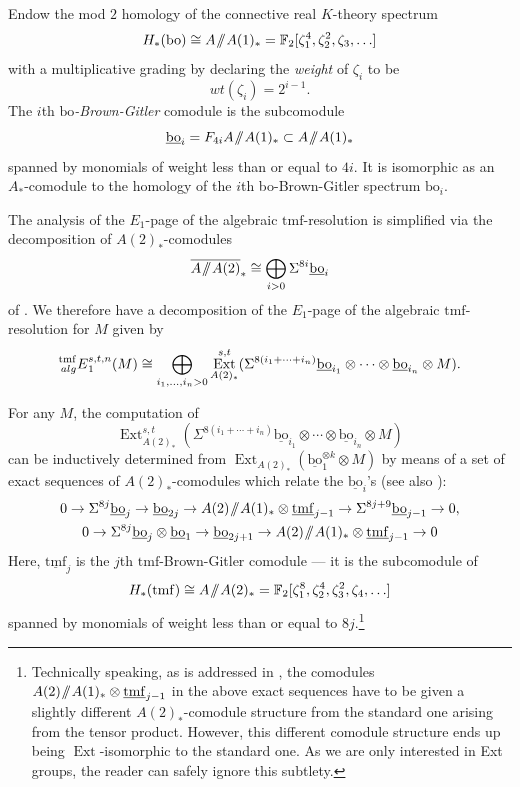 \documentclass[10pt]{amsart}
\newcommand{\sslash}{\mathbin{/\mkern-6mu/}}
\newcommand{\mmod}{\! \sslash \!}
\newcommand{\ul}[1]{\underline{#1}}
\newcommand{\br}[1]{\overline{#1}}
\newcommand{\FF}{\mathbb{F}}
\newcommand{\tmf}{\mathrm{tmf}}
\newcommand{\bo}{\mathrm{bo}}
\newcommand{\bou}{\ul{\bo}}
\theoremstyle{definition}
\numberwithin{equation}{section}
\numberwithin{figure}{section}
\DeclareMathOperator{\Ext}{Ext}
\newcommand{\xib}{\zeta}
\newcommand{\E}[2]{\prescript{#1}{#2}{E}}
\begin{document}
Endow the mod $2$ homology of the connective real $K$-theory spectrum 
$$ H_*(\bo) \cong A\mmod A(1)_* = \FF_2[\xib_1^4, \xib_2^2, \xib_3, \ldots] $$
with a multiplicative grading by declaring the \emph{weight} of $\xib_i$ to be 
\begin{equation}\label{eq:weight}
wt(\xib_i) = 2^{i-1}. 
\end{equation}
The $i$th \emph{$\bo$-Brown-Gitler} comodule is the subcomodule
$$ \bou_i = F_{4i}A\mmod A(1)_* \subset A \mmod A(1)_* $$
spanned by monomials of weight less than or equal to $4i$.  It is isomorphic as an $A_*$-comodule to the homology of the $i$th bo-Brown-Gitler spectrum $\bo_i$.

The analysis of the $E_1$-page of the algebraic $\tmf$-resolution is simplified via the decomposition of $A(2)_*$-comodules
$$ \br{A \mmod A(2)}_* \cong \bigoplus_{i > 0} \Sigma^{8i} \bou_i $$
of \cite[Cor.~5.5]{BHHM}.
We therefore have a decomposition of the $E_1$-page of the algebraic $\tmf$-resolution for $M$ given by
\begin{equation}\label{eq:E1decomp}
\E{\tmf}{alg}_1^{s,t,n}(M) \cong \bigoplus_{i_1, \ldots, i_n > 0}\Ext_{A(2)_*}^{s,t}(\Sigma^{8(i_1+\cdots+i_n)}\bou_{i_1} \otimes \cdots \otimes \bou_{i_n} \otimes M).
\end{equation}

For any $M$, the computation of
$$ \Ext_{A(2)_*}^{s,t}(\Sigma^{8(i_1+\cdots+i_n)}\bou_{i_1} \otimes \cdots \otimes \bou_{i_n} \otimes M) $$
can be inductively determined from $\Ext_{A(2)_*}(\bou_1^{\otimes k} \otimes M)$ by means of a set of exact sequences of $A(2)_*$-comodules which relate the $\bou_i$'s \cite[Sec.~7]{BHHM} (see also \cite{BOSS}):
\begin{gather}
0\to \Sigma^{8j} \ul{\bo}_j \to \ul{\bo}_{2j}\to A(2)\mmod A(1)_* \otimes \ul{\tmf}_{j-1}  \to \Sigma^{8j+9} \ul{\bo}_{j-1} \to 0 \label{eq:boSES1},
\\
0 \to \Sigma^{8j} \ul{\bo}_j \otimes \ul{\bo}_1 \to \ul{\bo}_{2j+1}\to A(2)\mmod A(1)_* \otimes \ul{\tmf}_{j-1} \to 0 \label{eq:boSES2}
\end{gather}
Here, $\ul{\tmf}_j$ is the $j$th $\tmf$-Brown-Gitler comodule --- it is the subcomodule of 
$$ H_*(\tmf) \cong A\mmod A(2)_* = \FF_2[\xib_1^8, \xib_2^4, \xib_3^2, \xib_4, \ldots] $$
spanned by monomials of weight less than or equal to $8j$.\footnote{
Technically speaking, as is addressed in \cite[Sec.~7]{BHHM}, the comodules $A(2)\mmod A(1)_* \otimes \ul{\tmf}_{j-1}$ in the above exact sequences have to be given a slightly different $A(2)_*$-comodule structure from the standard one arising from the tensor product.  However, this different comodule structure ends up being $\Ext$-isomorphic to the standard one.  As we are only interested in Ext groups, the reader can safely ignore this subtlety.}
\end{document}
